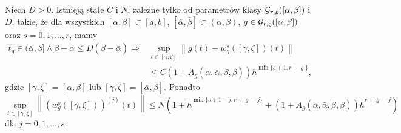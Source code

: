 \documentclass[oik, pdftex, man]{mgrwms}
\begin{document}
    \begin{stw} \label{stw:2:2014}
        Niech $D > 0$. Istnieją stałe $C$ i $\bar{N}$, zależne tylko od parametrów klasy $\mathcal{G}_{r,\varrho}([\alpha,\beta])$ i $D$, takie, że dla wszystkich $[\alpha, \beta] \subset [a,b]$, $[\bar{\alpha}, \bar{\beta}] \subset (\alpha, \beta)$, $g \in \mathcal{G}_{r,\varrho}([\alpha,\beta])$ oraz $s=0,1,\dots,r$, mamy
        \begin{equation} \label{eq:19}
            \begin{aligned}
                \hat{t}_{g} \in (\bar{\alpha}, \bar{\beta}] \land \beta-\alpha \leq D(\bar{\beta}-\bar{\alpha}) \Longrightarrow &\sup_{t \in[\gamma, \zeta]}\left\|g(t)-w_{g}^{s}([\gamma, \zeta])(t)\right\|\\
                &\leq C\left(1+A_{g}(\alpha, \bar{\alpha}, \bar{\beta}, \beta)\right) \bar{h}^{\min \{s+1, r+\varrho\}},
            \end{aligned}
        \end{equation}
        gdzie $[\gamma, \zeta]=[\alpha, \beta]$ lub $[\gamma, \zeta]=[\bar{\alpha}, \bar{\beta}]$. Ponadto
        \begin{equation} \label{eq:20}
            \sup _{t \in[\gamma, \zeta]}\left\|\left(w_{g}^{s}([\gamma, \zeta])\right)^{(j)}(t)\right\| \leq \bar{N}\left(1+\bar{h}^{\min \{s+1-j, r+\varrho-j\}}+\left(1+A_{g}(\alpha, \bar{\alpha}, \bar{\beta}, \beta)\right) \bar{h}^{r+\varrho-j}\right)
        \end{equation}
        dla $j=0,1,\dots,s$.
    \end{stw}
\end{document}
